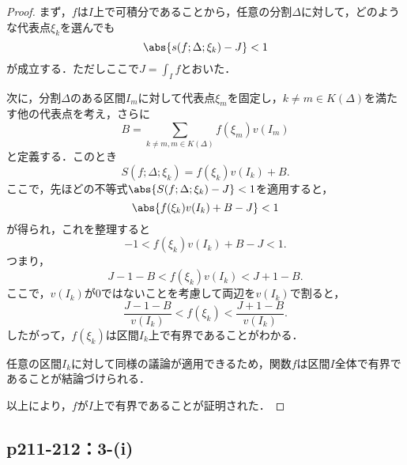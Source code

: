 \documentclass[uplatex,dvipdfmx,a4paper,10pt,fleqn]{jsarticle}
\begin{document}
\begin{tleftbar}
	\begin{proof}
	まず，$f$は$I$上で可積分であることから，任意の分割$\Delta$に対して，どのような代表点$\xi_k$を選んでも
	\[
	\abs{ s(f; \Delta; \xi_k) - J } < 1
	\]
	が成立する．ただしここで$J = \int_I f $とおいた．
	
	次に，分割$\Delta$のある区間$I_m$に対して代表点$\xi_m$を固定し，$k \ne m \in K(\Delta)$を満たす他の代表点を考え，さらに
	\[
	B = \sum_{k \ne m , m \in K(\Delta)} f(\xi_m) v(I_m)
	\]
	と定義する．このとき
	\[
	S(f; \Delta; \xi_k) = f(\xi_k) v(I_k) + B.
	\]
	ここで，先ほどの不等式$\abs{ S(f; \Delta; \xi_k) - J } < 1$を適用すると，
	\[
	\abs{ f(\xi_k) v(I_k) + B - J } < 1
	\]
	が得られ，これを整理すると
	\[
	-1 < f(\xi_k) v(I_k) + B - J < 1.
	\]
	つまり，
	\[
	J - 1 - B < f(\xi_k) v(I_k) < J + 1 - B.
	\]
	ここで，$v(I_k)$が$0$ではないことを考慮して両辺を$v(I_k)$で割ると，
	\[
	\frac{J - 1 - B}{v(I_k)} < f(\xi_k) < \frac{J + 1 - B}{v(I_k)}.
	\]
	したがって，$f(\xi_k)$は区間$I_k$上で有界であることがわかる．
	
	任意の区間$I_k$に対して同様の議論が適用できるため，関数$f$は区間$I$全体で有界であることが結論づけられる．
	
	以上により，$f$が$I$上で有界であることが証明された．
	\end{proof}
\end{tleftbar}

    \subsection*{p211-212：3-(i)}
\end{document}
